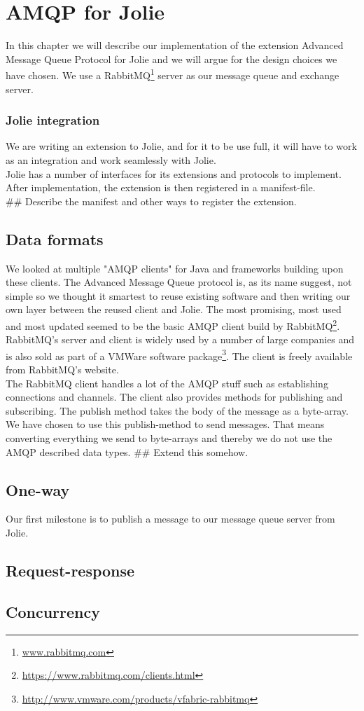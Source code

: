 \section{AMQP for Jolie}
In this chapter we will describe our implementation of the extension Advanced Message Queue Protocol for Jolie and we will argue for the design choices we have chosen. We use a RabbitMQ\footnote{\url{www.rabbitmq.com}} server as our message queue and exchange server.
\subsubsection{Jolie integration}
We are writing an extension to Jolie, and for it to be use full, it will have to work as an integration and work seamlessly with Jolie.\\
Jolie has a number of interfaces for its extensions and protocols to implement. After implementation, the extension is then registered in a manifest-file.\\
\#\# Describe the manifest and other ways to register the extension.
\subsection{Data formats}
We looked at multiple "AMQP clients" for Java and frameworks building upon these clients. The Advanced Message Queue protocol is, as its name suggest, not simple so we thought it smartest to reuse existing software and then writing our own layer between the reused client and Jolie. The most promising, most used and most updated seemed to be the basic AMQP client build by RabbitMQ\footnote{\url{https://www.rabbitmq.com/clients.html}}. RabbitMQ's server and client is widely used by a number of large companies and is also sold as part of a VMWare software package\footnote{\url{http://www.vmware.com/products/vfabric-rabbitmq}}. The client is freely available from RabbitMQ's website.\\
The RabbitMQ client handles a lot of the AMQP stuff such as establishing connections and channels. The client also provides methods for publishing and subscribing. The publish method takes the body of the message as a byte-array. We have chosen to use this publish-method to send messages. That means converting everything we send to byte-arrays and thereby we do not use the AMQP described data types. ## Extend this somehow.
\subsection{One-way}
Our first milestone is to publish a message to our message queue server from Jolie.
\subsection{Request-response}
\subsection{Concurrency}
\newpage